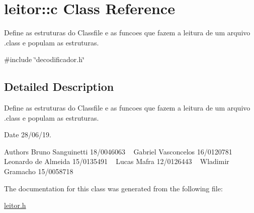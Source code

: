\hypertarget{classleitor_1_1c}{}\section{leitor\+:\+:c Class Reference}
\label{classleitor_1_1c}


Define as estruturas do Classfile e as funcoes que fazem a leitura de um arquivo .class e populam as estruturas.  




{\ttfamily \#include \char`\"{}decodificador.\+h\char`\"{}}



\subsection{Detailed Description}
Define as estruturas do Classfile e as funcoes que fazem a leitura de um arquivo .class e populam as estruturas. 

\begin{DoxyDate}{Date}
28/06/19.
\end{DoxyDate}
\begin{DoxyAuthor}{Authors}
Bruno Sanguinetti 18/0046063 ~\newline
Gabriel Vasconcelos 16/0120781 ~\newline
Leonardo de Almeida 15/0135491 ~\newline
Lucas Mafra 12/0126443 ~\newline
Wladimir Gramacho 15/0058718 ~\newline

\end{DoxyAuthor}


The documentation for this class was generated from the following file\+:\begin{DoxyCompactItemize}
\item 
\hyperlink{leitor_8h}{leitor.\+h}\end{DoxyCompactItemize}
